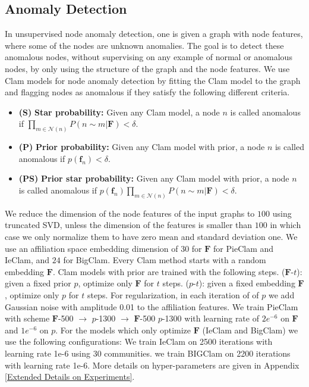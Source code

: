 \documentclass[letterpaper]{article} %
\begin{document}
\subsection{Anomaly Detection}
\label{sec:anomaly_detection}

In unsupervised node anomaly detection, one is given a graph with node features, where some of the nodes are unknown anomalies. The goal is to detect these anomalous nodes, without supervising on any example of normal or anomalous nodes, by only using the structure of the graph and the node features.  
%
We use Clam models for node anomaly detection by fitting the Clam model to the graph and flagging nodes as anomalous if they satisfy the following different criteria.
\begin{itemize}
    \item 
    \textbf{(S)} \textbf{Star probability:} Given any Clam model, a node $n$ is called anomalous if $\prod_{m\in\mathcal{N}(n)}P(n\sim m| \mathbf{F})<\delta$. 
    \item 
    \textbf{(P)} \textbf{Prior probability:} Given any Clam model with prior, a node $n$ is called anomalous if $p(\mathbf{f}_n)<\delta$. 
    \item 
     \textbf{(PS)} \textbf{Prior star probability:} Given any Clam model with prior, a node $n$ is called anomalous if $p(\mathbf{f}_n)\prod_{m\in\mathcal{N}(n)}P(n\sim m| \mathbf{F})<\delta$. 
\end{itemize}
 We reduce the dimension of the node features of the input graphs to $100$ using truncated SVD, unless the dimension of the features is smaller than $100$ in which case we only normalize them to have zero mean and standard deviation one.   We use an affiliation space embedding dimension of 30 for $\mathbf{F}$ for PieClam and IeClam, and $24$ for BigClam.
Every Clam method starts with a random embedding $\mathbf{F}$.  Clam models with prior are trained with the following steps. 
 ($\mathbf{F}$-$t$): given a fixed prior $p$, optimize only $\mathbf{F}$ for $t$ steps. ($p$-$t$): given a fixed embedding $\mathbf{F}$, optimize only $p$ for $t$ steps. For regularization, in each iteration of of $p$ we add Gaussian noise with amplitude 0.01 to the affiliation features. We train PieClam with scheme $\mathbf{F}$-500 $\rightarrow$ $p$-1300 $\rightarrow$ $\mathbf{F}$-500 $p$-1300 with learning rate of $2e^{-6}$ on $\mathbf{F}$  and $1e^{-6}$ on $p$.  
For the models which only optimize $\mathbf{F}$ (IeClam and BigClam)  we use the following configurations: We train IeClam on 2500 iterations with learning rate 1e-6 using 30 communities. we train BIGClam on 2200 iterations with learning rate 1e-6.
More details on hyper-parameters are given in Appendix \ref{Extended Details on Experiments}.
\end{document}
